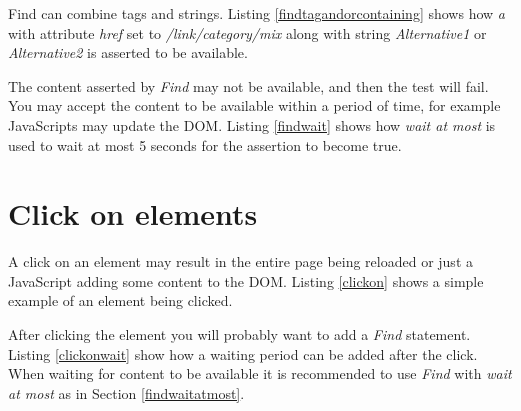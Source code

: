 \documentclass[a4paper,11pt]{kth-mag}
\begin{document}
Find can combine tags and strings. Listing \ref{findtagandorcontaining} shows how \textit{a} with attribute \textit{href} set to \textit{/link/category/mix} along with string \textit{Alternative1} or \textit{Alternative2} is asserted to be available.

\lstset{basicstyle=\footnotesize, caption=Find statement with combined tag and containing with and/or logics, label=findtagandorcontaining, numbers=left, frame=single, captionpos=b, breaklines=true}


\label{findwaitatmost}
The content asserted by \textit{Find} may not be available, and then the test will fail. You may accept the content to be available within a period of time, for example JavaScripts may update the DOM. Listing \ref{findwait} shows how \textit{wait at most} is used to wait at most 5 seconds for the assertion to become true.

\lstset{basicstyle=\footnotesize, caption=Find statement with wait at most, label=findwait, numbers=left, frame=single, captionpos=b, breaklines=true}


\section{Click on elements}
A click on an element may result in the entire page being reloaded or just a JavaScript adding some content to the DOM. Listing \ref{clickon} shows a simple example of an element being clicked.

\lstset{basicstyle=\footnotesize, caption=Click on, label=clickon, numbers=left, frame=single, captionpos=b, breaklines=true}


After clicking the element you will probably want to add a \textit{Find} statement. Listing \ref{clickonwait} show how a waiting period can be added after the click. When waiting for content to be available it is recommended to use \textit{Find} with \textit{wait at most} as in Section \ref{findwaitatmost}.

\lstset{basicstyle=\footnotesize, caption=Click on and wait, label=clickonwait, numbers=left, frame=single, captionpos=b, breaklines=true}

\end{document}
